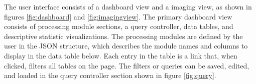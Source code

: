 The user interface consists of a dashboard view and a imaging view, as shown in figures \ref{fig:dashboard} and \ref{fig:imagingview}. The primary dashboard view consists of processing module sections, a query controller, data tables, and descriptive statistic visualizations. The processing modules are defined by the user in the JSON structure, which describes the module names and columns to display in the data table below. Each entry in the table is a link that, when clicked, filters all tables on the page. The filters or queries can be saved, edited, and loaded in the query controller section shown in figure \ref{fig:query}. 
